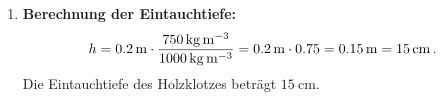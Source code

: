 \documentclass[ngerman]{scrreprt}
\newenvironment{loesungbox}[1]
  {\needspace{5\baselineskip}\begin{loesungboxstyle}[frametitle={#1}]}
  {\end{loesungboxstyle}}
\begin{document}
\begin{loesungbox}{Lösung zu \Cref{aufg:auftrieb_holzklotz}}
\begin{enumerate}
\begin{equation}
        \rho_{\text{Holz}} \cdot L = \rho_{\text{Wasser}} \cdot h \implies h = L \cdot \frac{\rho_{\text{Holz}}}{\rho_{\text{Wasser}}}
    \end{equation}
    \item \textbf{Berechnung der Eintauchtiefe:}
    \begin{equation}\label{eq: holz_h_wert}
        h = \SI{0.2}{\metre} \cdot \frac{\SI{750}{\kg\per\m\cubed}}{\SI{1000}{\kg\per\m\cubed}} = \SI{0.2}{\metre} \cdot 0.75 = \SI{0.15}{\metre} = \SI{15}{\centi\metre} \mDot
    \end{equation}
    Die Eintauchtiefe des Holzklotzes beträgt $\SI{15}{\centi\metre}$.
\end{enumerate}
\end{loesungbox}
\end{document}
